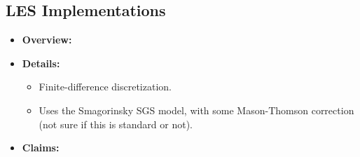 \documentclass[12pt]{article}
\begin{document}
\subsection{LES Implementations}


\begin{itemize}
    \item \textbf{Overview:}
    \item \textbf{Details:} 
    \begin{itemize}
        \item Finite-difference discretization.
        \item Uses the Smagorinsky SGS model, with some Mason-Thomson correction (not sure
            if this is standard or not).
    \end{itemize}
    \item \textbf{Claims:}
\end{itemize}

\end{document}
